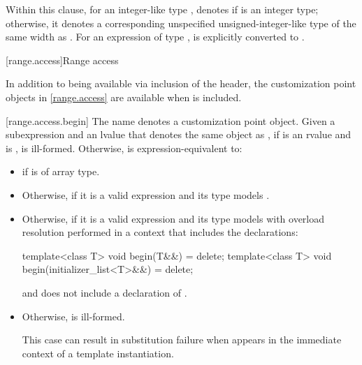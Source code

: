 \pnum
{}%
%
Within this clause,
for an integer-like type ,
 denotes
 if  is an integer type;
otherwise, it denotes a corresponding unspecified unsigned-integer-like type
of the same width as .
For an expression  of type ,
 is
 explicitly converted to
.

[range.access]{Range access}

\pnum
In addition to being available via inclusion of the 
header, the customization point objects in \ref{range.access} are
available when  is included.

[range.access.begin]{}
\pnum
The name  denotes a customization point
object.
Given a subexpression  and
an lvalue  that denotes the same object as ,
if  is an rvalue and
 is ,
 is ill-formed.
Otherwise,
 is
expression-equivalent to:
\begin{itemize}
\item
   if  is of array type.

\item
  Otherwise,
  if it is a valid expression and its type  models
  .

\item
  Otherwise,  if it is a
  valid expression and its type  models
   with overload
  resolution performed in a context that includes the declarations:
\begin{codeblock}
template<class T> void begin(T&&) = delete;
template<class T> void begin(initializer_list<T>&&) = delete;
\end{codeblock}
  and does not include a declaration of .

\item
  Otherwise,  is ill-formed.
  \begin{note}
  This case can result in substitution failure when 
  appears in the immediate context of a template instantiation.
  \end{note}
\end{itemize}

